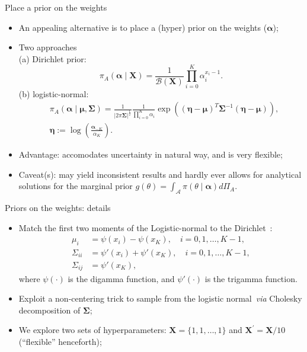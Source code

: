 \begin{frame}{Place a prior on the weights}
 \begin{itemize}
  \item An appealing alternative is to place a (hyper) prior on the weights ($\boldsymbol\alpha$);
  \item Two approaches\\
 (a) Dirichlet prior:
\[ \pi_A(\boldsymbol\alpha \mid \boldsymbol X) = \frac{1}{\mathcal{B}(\boldsymbol X)}\prod_{i=0}^K \alpha_i^{x_i-1}.\]
 (b) logistic-normal:
 \begin{align*}
  &\pi_A(\boldsymbol\alpha \mid \boldsymbol \mu, \boldsymbol \Sigma) = \frac{1}{|2\pi \boldsymbol \Sigma|^{\frac{1}{2}}}\frac{1}{\prod_{i=0}^K \alpha_i}
  \exp\left(
     \left(\boldsymbol \eta - \boldsymbol \mu\right)^T
     {\boldsymbol \Sigma}^{-1}
     \left( \boldsymbol \eta - \boldsymbol \mu\right)
     \right),\\
      &\boldsymbol \eta := \log\left(\frac{\boldsymbol \alpha_{-K}}{\alpha_K}\right).
 \end{align*}
 \item Advantage: accomodates uncertainty in natural way, and is very flexible;
 \item Caveat(s): may yield inconsistent results and hardly ever allows for analytical solutions for the marginal prior $g(\theta) = \int_{\mathcal{A}} \pi(\theta \mid \boldsymbol\alpha)d\Pi_A$.
 \end{itemize}
\end{frame}
\begin{frame}{Priors on the weights: details}
 \begin{itemize}
\item Match the first two moments of the Logistic-normal to the Dirichlet~\citep{aitchson1980}:
  \begin{align*}
 \label{eq:momentmatching}
 \mu_i & = \psi(x_i) - \psi(x_K), \quad i=0,1,\ldots,K-1, \\
 \Sigma_{ii} & = \psi'(x_i) + \psi'(x_K), \quad i=0,1,\ldots,K-1, \\
 \Sigma_{ij} & = \psi'(x_K),
\end{align*}
where $\psi(\cdot)$ is the digamma function, and $\psi'(\cdot)$ is the trigamma function.
\item Exploit a non-centering trick to sample from the logistic normal~\textit{via} Cholesky decomposition of $\boldsymbol \Sigma$;  
\item We explore two sets of hyperparameters: $\boldsymbol X = \{1, 1, \ldots, 1\}$ and $\boldsymbol X^\prime = \boldsymbol X/10$ (``flexible'' henceforth);
 \end{itemize}
\end{frame}
